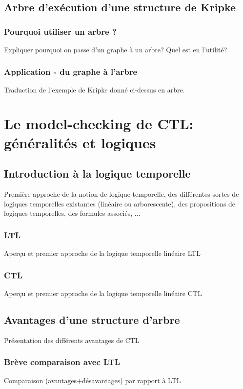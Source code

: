 \documentclass[runningheads,a4paper,11pt]{llncs}
\begin{document}
\subsection{Arbre d'exécution d'une structure de Kripke}

\subsubsection{Pourquoi utiliser un arbre ?}
Expliquer pourquoi on passe d'un graphe à un arbre? Quel est en l'utilité? 

\subsubsection{Application - du graphe à l'arbre}
Traduction de l'exemple de Kripke donné ci-dessus en arbre. 

\section{Le model-checking de CTL: généralités et logiques}

\subsection{Introduction à la logique temporelle}
Première approche de la notion de logique temporelle, des différentes sortes de logiques temporelles existantes (linéaire ou arborescente), des propositions de logiques temporelles, des formules associés, ... 

\subsubsection{LTL}
Aperçu et premier approche de la logique temporelle linéaire LTL 

\subsubsection{CTL}
Aperçu et premier approche de la logique temporelle linéaire CTL 

\subsection{Avantages d'une structure d'arbre}
Présentation des différents avantages de CTL

\subsubsection{Brève comparaison avec LTL}
Comparaison (avantages+désavantages) par rapport à LTL 
\end{document}
